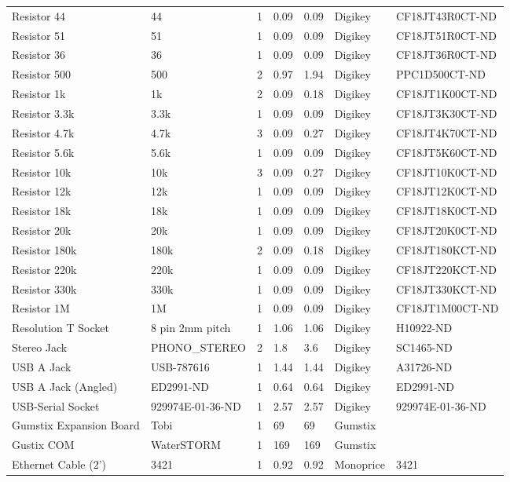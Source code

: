 \begin{landscape}
\begin{center}
\begin{longtable}{|p{2in}|p{1.5in}|p{.75in}|p{.5in}|p{.5in}|p{1in}|p{1.5in}|}
Resistor 44 & 44 & 1 & 0.09 & 0.09 & Digikey & CF18JT43R0CT-ND\\ 
Resistor 51 & 51 & 1 & 0.09 & 0.09 & Digikey & CF18JT51R0CT-ND\\ 
Resistor 36 & 36 & 1 & 0.09 & 0.09 & Digikey & CF18JT36R0CT-ND\\ 
Resistor 500 & 500 & 2 & 0.97 & 1.94 & Digikey & PPC1D500CT-ND\\ 
Resistor 1k & 1k & 2 & 0.09 & 0.18 & Digikey & CF18JT1K00CT-ND\\ 
Resistor 3.3k & 3.3k & 1 & 0.09 & 0.09 & Digikey & CF18JT3K30CT-ND\\ 
Resistor 4.7k & 4.7k & 3 & 0.09 & 0.27 & Digikey & CF18JT4K70CT-ND\\ 
Resistor 5.6k & 5.6k & 1 & 0.09 & 0.09 & Digikey & CF18JT5K60CT-ND\\ 
Resistor 10k & 10k & 3 & 0.09 & 0.27 & Digikey & CF18JT10K0CT-ND\\ 
Resistor 12k & 12k & 1 & 0.09 & 0.09 & Digikey & CF18JT12K0CT-ND\\ 
Resistor 18k & 18k & 1 & 0.09 & 0.09 & Digikey & CF18JT18K0CT-ND\\ 
Resistor 20k & 20k & 1 & 0.09 & 0.09 & Digikey & CF18JT20K0CT-ND\\ 
Resistor 180k & 180k & 2 & 0.09 & 0.18 & Digikey & CF18JT180KCT-ND\\ 
Resistor 220k & 220k & 1 & 0.09 & 0.09 & Digikey & CF18JT220KCT-ND\\ 
Resistor 330k & 330k & 1 & 0.09 & 0.09 & Digikey & CF18JT330KCT-ND\\ 
Resistor 1M & 1M & 1 & 0.09 & 0.09 & Digikey & CF18JT1M00CT-ND\\ 
Resolution T Socket & 8 pin 2mm pitch & 1 & 1.06 & 1.06 & Digikey & H10922-ND\\ 
Stereo Jack & PHONO\_STEREO & 2 & 1.8 & 3.6 & Digikey & SC1465-ND\\ 
USB A Jack & USB-787616 & 1 & 1.44 & 1.44 & Digikey & A31726-ND\\ 
USB A Jack (Angled) & ED2991-ND & 1 & 0.64 & 0.64 & Digikey & ED2991-ND\\ 
USB-Serial Socket & 929974E-01-36-ND & 1 & 2.57 & 2.57 & Digikey & 929974E-01-36-ND\\ 
Gumstix Expansion Board & Tobi & 1 & 69 & 69 & Gumstix & \\ 
Gustix COM & WaterSTORM & 1 & 169 & 169 & Gumstix & \\ 
Ethernet Cable (2') & 3421 & 1 & 0.92 & 0.92 & Monoprice & 3421\\ 

\end{longtable}
\end{center}
\end{landscape}
